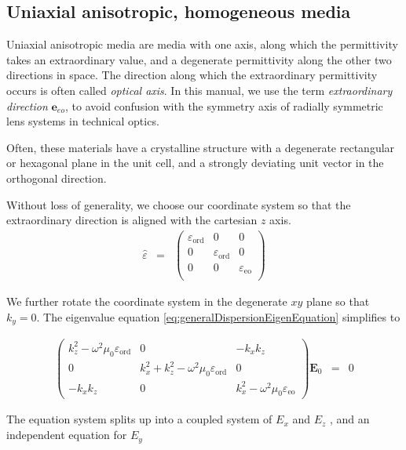 \documentclass[12pt,a4paper,twoside,openright,BCOR10mm,headsepline,titlepage,abstracton,chapterprefix,final]{scrreprt}
\newcommand\Vector[1]{{\mathbf{#1}}}
\newcommand\vacuum{0}
\newcommand\wavenumber{k}
\newcommand\Tensor[1]{\hat{#1}}
\newcommand\scalarEfield{E}
\newcommand\Efield{\Vector{\scalarEfield}}
\newcommand\vacuumpermeability{\scalarpermeability_{\vacuum}}
\newcommand\scalarpermeability{\mu}
\newcommand\permittivity{\Tensor{\scalarpermittivity}}
\newcommand\scalarpermittivity{\varepsilon}
\newcommand\ordi{\text{ord}}
\newcommand\eo{\text{eo}}
\begin{document}
\subsection{Uniaxial anisotropic, homogeneous media}
Uniaxial anisotropic media are media with one axis, along which the permittivity takes an extraordinary value, 
and a degenerate permittivity along the other two directions in space.
The direction along which the extraordinary permittivity occurs is often called \emph{optical axis}. 
In this manual, we use the term \emph{extraordinary direction} $\Vector{e}_{eo}$, to avoid confusion with the symmetry axis of radially symmetric lens systems in technical optics.

Often, these materials have a crystalline structure with a degenerate rectangular or hexagonal plane in the unit cell, 
and a strongly deviating unit vector in the orthogonal direction. 

Without loss of generality, we choose our coordinate system so that the extraordinary direction is aligned with the cartesian $z$ axis.
\begin{eqnarray}
 \permittivity &=&
 \begin{pmatrix}
  \scalarpermittivity_{\ordi}  & 0 & 0 \\
  0 & \scalarpermittivity_{\ordi}  & 0 \\
  0 & 0 & \scalarpermittivity_{\eo}   \\
 \end{pmatrix}
\end{eqnarray}

We further rotate the coordinate system in the degenerate $xy$ plane so that $\wavenumber_y = 0$.
The eigenvalue equation \ref{eq:generalDispersionEigenEquation} simplifies to

\begin{eqnarray}
\begin{pmatrix}
 \wavenumber_z^2 - \omega^2 \vacuumpermeability \scalarpermittivity_{\ordi} 
 &
 0
 &
 - \wavenumber_x \wavenumber_z 
 \\
 0
 &
 \wavenumber_x^2 + \wavenumber_z^2 - \omega^2 \vacuumpermeability \scalarpermittivity_{\ordi} 
 &
 0 
 \\
 - \wavenumber_x \wavenumber_z 
 &
 0 
 &
 \wavenumber_x^2 - \omega^2 \vacuumpermeability \scalarpermittivity_{\eo}  
\end{pmatrix}
\Efield_0
&=& 0
\end{eqnarray}

The equation system splits up into a coupled system of $\scalarEfield_x$ and $\scalarEfield_z$ , and an independent equation for $\scalarEfield_y$
\end{document}
